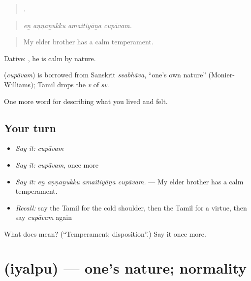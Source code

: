 \begin{quote}
   .
\end{quote}

\begin{quote}
\emph{eṉ aṇṇaṉukku amaitiyāṉa cupāvam.}
\end{quote}

\begin{quote}
My elder brother has a calm temperament.
\end{quote}

Dative:   , he is calm by nature.

\begin{cousinweb}
\textbf{} (\emph{cupāvam}) is borrowed from Sanskrit \emph{svabhāva}, \textquotedblleft{}one's own nature\textquotedblright{} (Monier-Williams); Tamil drops the \emph{v} of \emph{sv}.
\end{cousinweb}

\begin{grammarlens}[title={What you've built}]
One more word for describing what you lived and felt.
\end{grammarlens}

\subsection*{Your turn}
\begin{itemize}
\raggedright
  \item \emph{Say it:} \emph{cupāvam}
  \item \emph{Say it:} \emph{cupāvam}, once more
  \item \emph{Say it:} \emph{eṉ aṇṇaṉukku amaitiyāṉa cupāvam.} — My elder brother has a calm temperament.
  \item \emph{Recall:} say the Tamil for the cold shoulder, then the Tamil for a virtue, then say \emph{cupāvam} again
\end{itemize}

\begin{tcolorbox}[breakable,colback=teal!4,colframe=teal!35!black,title={Before you move on}]
What does  mean? (\textquotedblleft{}Temperament; disposition\textquotedblright{}.) Say it once more.
\end{tcolorbox}
\section[\texorpdfstring{\ta{இயல்பு} (iyalpu)}{இயல்பு (iyalpu)}]{ (iyalpu) — one’s nature; normality}

